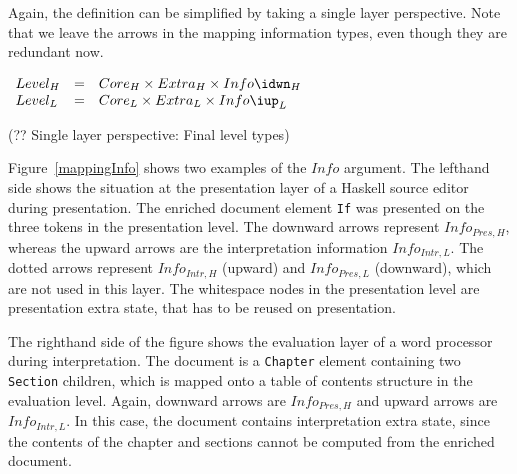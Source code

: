 Again, the definition can be simplified by taking a single layer perspective. Note that we leave the arrows in the  mapping information types, even though they are redundant now.

\begin{small}\(\begin{array}{lcll} \label{spec:extraStateSL}
Level_{H} & = & Core_{H} \times Extra_{H} \times Info\idwn_{H}\\
Level_{L} & = & Core_{L} \times Extra_{L} \times Info\iup_{L}\\
\end{array}\)\end{small}
\begin{center}(?? Single layer perspective: Final level types)\end{center}\vspace{1em}

\bc
Figure~\ref{mappingInfo} shows two examples of the $Info$ argument. The lefthand side shows the situation at the presentation layer of a Haskell source editor during presentation.  The enriched document element \verb|If|  was presented on the three tokens in the presentation level. The downward arrows represent $Info_{Pres,H}$, whereas the upward arrows are the interpretation information $Info_{Intr, L}$. The dotted arrows represent $Info_{Intr,H}$ (upward) and $Info_{Pres,L}$ (downward), which are not used in this layer. The whitespace nodes in the presentation level are presentation extra state, that has to be reused on presentation. 

The righthand side of the figure shows the evaluation layer of a word processor during interpretation. The document is a \verb|Chapter| element containing two \verb|Section| children, which is mapped onto a table of contents structure in the evaluation level. Again, downward arrows are $Info_{Pres,H}$ and upward arrows are $Info_{Intr,L}$.  In this case, the document contains interpretation extra state, since the contents of the chapter and sections cannot be computed from the enriched document.  

